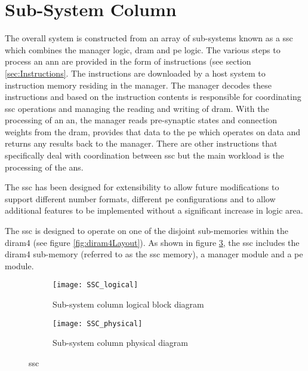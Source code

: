 \section{Sub-System Column}
\label{sec:Sub-System Column}

The overall system is constructed from an array of sub-systems known as a \acf{ssc} which combines the manager logic, \ac{dram} and \ac{pe} logic.
The various steps to process an \ac{ann} are provided in the form of instructions (see section \ref{sec:Instructions}. 
The instructions are downloaded by a host system to instruction memory residing in the manager.
The manager decodes these instructions and based on the instruction contents is responsible for coordinating \ac{ssc} operations and managing the reading and writing of \ac{dram}.
With the processing of an \ac{an}, the manager reads pre-synaptic states and connection weights from the \ac{dram}, provides that data to the \ac{pe} which operates on data and returns any results back to the manager.
There are other instructions that specifically deal with coordination between \ac{ssc} but the main workload is the processing of the \acp{an}.

The \ac{ssc} has been designed for extensibility to allow future modifications to support different number formats, different \ac{pe} configurations and to allow additional features to be implemented without a significant increase in logic area.

The \ac{ssc} is designed to operate on one of the disjoint sub-memories within the \ac{diram4} (see figure \ref{fig:diram4Layout}).
As shown in figure \ref{fig:SSC}, the \ac{ssc} includes the \ac{diram4} sub-memory (referred to as the \ac{ssc} memory), a manager module and a \ac{pe} module.
\begin{figure}
\centering
\begin{subfigure}{.44\textwidth}
  \centering
  \texttt{[image: SSC\_logical]}
  \captionsetup{justification=centering, skip=10pt}
  \vspace{-6pt}
  \caption{Sub-system column logical block diagram}
  \label{fig:Sub-system Column Logical Block Diagram}
\end{subfigure}%
\begin{subfigure}{.54\textwidth}
  \centering
  \texttt{[image: SSC\_physical]}
  \captionsetup{justification=centering, skip=10pt}
  \vspace{20pt}
  \caption{Sub-system column physical diagram}
  \label{fig:Sub-system Column Physical Diagram}
\end{subfigure}
\captionsetup{justification=centering, skip=12pt}
\caption{\acf{ssc}}
\label{fig:SSC}
\end{figure}

